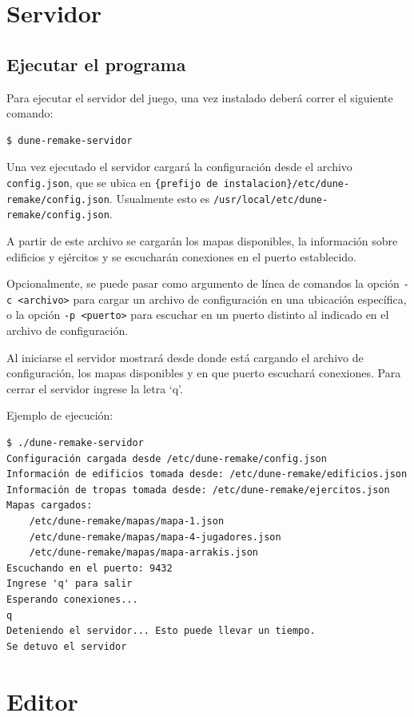 \documentclass[titlepage,a4paper,12pt]{article}
\begin{document}
\newpage
\section{Servidor}

\subsection{Ejecutar el programa}

Para ejecutar el servidor del juego, una vez instalado deberá correr el siguiente comando:
\begin{verbatim}
$ dune-remake-servidor
\end{verbatim}

Una vez ejecutado el servidor cargará la configuración desde el archivo \texttt{config.json}, que se ubica en \texttt{\{prefijo de instalacion\}/etc/dune-remake/config.json}. Usualmente esto es \texttt{/usr/local/etc/dune-remake/config.json}.

A partir de este archivo se cargarán los mapas disponibles, la información sobre edificios y ejércitos y se escucharán conexiones en el puerto establecido.

Opcionalmente, se puede pasar como argumento de línea de comandos la opción \texttt{-c <archivo>} para cargar un archivo de configuración en una ubicación específica, o la opción \texttt{-p <puerto>} para escuchar en un puerto distinto al indicado en el archivo de configuración.

Al iniciarse el servidor mostrará desde donde está cargando el archivo de configuración, los mapas disponibles y en que puerto escuchará conexiones. Para cerrar el servidor ingrese la letra `q'.

Ejemplo de ejecución:
\begin{verbatim}
$ ./dune-remake-servidor
Configuración cargada desde /etc/dune-remake/config.json
Información de edificios tomada desde: /etc/dune-remake/edificios.json
Información de tropas tomada desde: /etc/dune-remake/ejercitos.json
Mapas cargados: 
	/etc/dune-remake/mapas/mapa-1.json
	/etc/dune-remake/mapas/mapa-4-jugadores.json
	/etc/dune-remake/mapas/mapa-arrakis.json
Escuchando en el puerto: 9432
Ingrese 'q' para salir
Esperando conexiones...
q
Deteniendo el servidor... Esto puede llevar un tiempo.
Se detuvo el servidor
\end{verbatim}

\newpage
\section{Editor}
\end{document}
